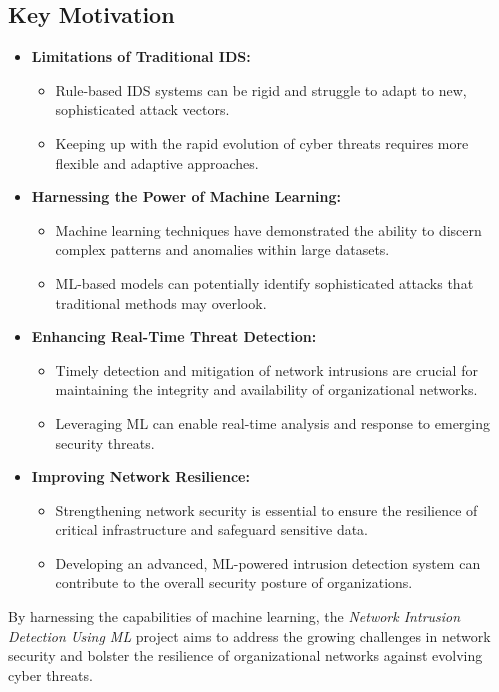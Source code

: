 \subsection{Key Motivation}
\begin{itemize}
    \item \textbf{Limitations of Traditional IDS:}
    \begin{itemize}
        \item Rule-based IDS systems can be rigid and struggle to adapt to new, sophisticated attack vectors.
        \item Keeping up with the rapid evolution of cyber threats requires more flexible and adaptive approaches.
    \end{itemize}
    \item \textbf{Harnessing the Power of Machine Learning:}
    \begin{itemize}
        \item Machine learning techniques have demonstrated the ability to discern complex patterns and anomalies within large datasets.
        \item ML-based models can potentially identify sophisticated attacks that traditional methods may overlook.
    \end{itemize}
    \item \textbf{Enhancing Real-Time Threat Detection:}
    \begin{itemize}
        \item Timely detection and mitigation of network intrusions are crucial for maintaining the integrity and availability of organizational networks.
        \item Leveraging ML can enable real-time analysis and response to emerging security threats.
    \end{itemize}
    \item \textbf{Improving Network Resilience:}
    \begin{itemize}
        \item Strengthening network security is essential to ensure the resilience of critical infrastructure and safeguard sensitive data.
        \item Developing an advanced, ML-powered intrusion detection system can contribute to the overall security posture of organizations.
    \end{itemize}
\end{itemize}
    By harnessing the capabilities of machine learning, the \textit{Network Intrusion Detection Using ML} project aims to address the growing challenges in network security and bolster the resilience of organizational networks against evolving cyber threats.


